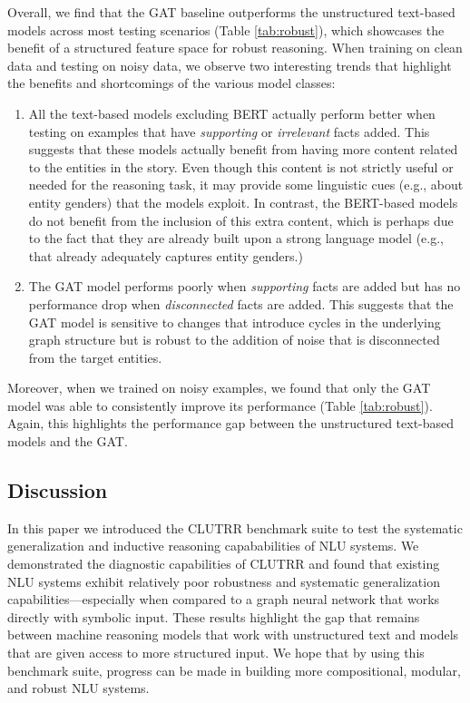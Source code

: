 \documentclass[12pt]{article}
\begin{document}


Overall, we find that the GAT baseline outperforms the unstructured text-based models across most testing scenarios (Table \ref{tab:robust}), which showcases the benefit of a structured feature space for robust reasoning.
When training on clean data and testing on noisy data, we observe two interesting trends that highlight the benefits and shortcomings of the various model classes:

\begin{enumerate}
    \item All the text-based models excluding BERT actually perform better when testing on examples that have {\em supporting} or {\em irrelevant} facts added. This suggests that these models actually benefit from having more content related to the entities in the story. Even though this content is not strictly useful or needed for the reasoning task, it may provide some linguistic cues (e.g., about entity genders) that the models exploit. In contrast, the BERT-based models do not benefit from the inclusion of this extra content, which is perhaps due to the fact that they are already built upon a strong language model (e.g., that already adequately captures entity genders.)
    \item  The GAT model performs poorly when {\em supporting} facts are added but has no performance drop when {\em disconnected} facts are added. This suggests that the GAT model is sensitive to changes that introduce cycles in the underlying graph structure but is robust to the addition of noise that is disconnected from the target entities.
\end{enumerate}
Moreover, when we trained on noisy examples, we found that only the GAT model was able to consistently improve its performance (Table \ref{tab:robust}).
Again, this highlights the performance gap between the unstructured text-based models and the GAT.

\subsection{Discussion}

In this paper we introduced the CLUTRR benchmark suite to test the systematic generalization and inductive reasoning capababilities of NLU systems.
We demonstrated the diagnostic capabilities of CLUTRR and found that existing NLU systems exhibit relatively poor robustness and systematic generalization capabilities---especially when compared to a graph neural network that works directly with symbolic input.
These results highlight the gap that remains between machine reasoning models that work with unstructured text and models that are given access to more structured input.
We hope that by using this benchmark suite, progress can be made in building more compositional, modular, and robust NLU systems.
\end{document}
